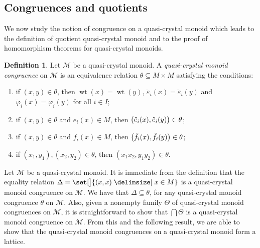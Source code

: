 \documentclass[a4paper,reqno]{amsart}
\numberwithin{equation}{section}
\theoremstyle{plain}
\theoremstyle{definition}
\newtheorem{dfn}[thm]{Definition}
\theoremstyle{remark}
\newcommand*{\dtgterm}[1]{\emph{#1}}  %
\DeclarePairedDelimiter{\parens}{\lparen}{\rparen}
\newcommand*{\setsymbol}[1][]{#1\vert}
\providecommand*{\given}{\relax}
\renewcommand*{\given}{\mathclose{}\mathrel{\setsymbol[\delimsize]}\mathopen{}}%
\renewcommand*{\given}{\mathclose{}\mathrel{\setsymbol[\delimsize]}\mathopen{}}%
\newcommand*{\pressymbol}[1][]{#1\vert}
\renewcommand*{\given}{\mathclose{}\mathrel{\pressymbol[\delimsize]}\mathopen{}}%
\DeclareMathOperator{\wt}{wt}
\newcommand*{\qcrst}[1]{\mathcal{#1}}
\newcommand*{\qKoe}{\ddot{e}}
\newcommand*{\qKof}{\ddot{f}}
\newcommand*{\qKoec}{\ddot{\varepsilon}}
\newcommand*{\qKofc}{\ddot{\varphi}}
\newcommand*{\qcmon}[1]{\qcrst{#1}}
\newcommand*{\qcrstM}{\qcmon{M}}
\begin{document}
\subsection{Congruences and quotients}
\label{subsec:qcmcq}


We now study the notion of congruence on a quasi-crystal monoid which leads to the definition of quotient quasi-crystal monoid and to the proof of homomorphism theorems for quasi-crystal monoids.

\begin{dfn}
\label{dfn:qcmc}
Let $\qcrstM$ be a quasi-crystal monoid.
A \dtgterm{quasi-crystal monoid congruence} on $\qcrstM$ is an equivalence relation $\theta \subseteq M \times M$ satisfying the conditions:
\begin{enumerate}
\item\label{dfn:qcmcwtc}
if $(x, y) \in \theta$, then $\wt (x) = \wt (y)$, $\qKoec_i (x) = \qKoec_i (y)$ and $\qKofc_i (x) = \qKofc_i (y)$ for all $i \in I$;

\item\label{dfn:qcmcqKoe}
if $(x, y) \in \theta$ and $\qKoe_i (x) \in M$, then $\parens[\big]{\qKoe_i (x), \qKoe_i (y)} \in \theta$;

\item\label{dfn:qcmcqKof}
if $(x, y) \in \theta$ and $\qKof_i (x) \in M$, then $\parens[\big]{\qKof_i (x), \qKof_i (y)} \in \theta$;

\item\label{dfn:qcmcmul}
if $(x_1, y_1), (x_2, y_2) \in \theta$, then $(x_1 x_2, y_1 y_2) \in \theta$.
\end{enumerate}
\end{dfn}

Let $\qcrstM$ be a quasi-crystal monoid.
It is immediate from the definition that the equality relation $\Delta = \set[\big]{ (x, x) \given x \in M }$ is a quasi-crystal monoid congruence on $\qcrstM$.
We have that $\Delta \subseteq \theta$, for any quasi-crystal monoid congruence $\theta$ on $\qcrstM$.
Also, given a nonempty family $\Theta$ of quasi-crystal monoid congruences on $\qcrstM$, it is straightforward to show that $\bigcap \Theta$ is a quasi-crystal monoid congruence on $\qcrstM$.
From this and the following result, we are able to show that the quasi-crystal monoid congruences on a quasi-crystal monoid form a lattice.
\end{document}
